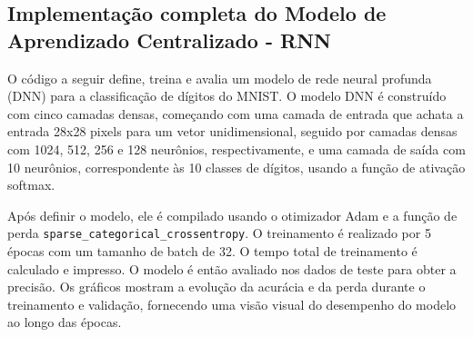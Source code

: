 \subsection{Implementação completa do Modelo de Aprendizado Centralizado - RNN}

O  código a seguir define, treina e avalia um modelo de rede neural profunda (DNN) para a classificação de dígitos do MNIST. O modelo DNN é construído com cinco camadas densas, começando com uma camada de entrada que achata a entrada 28x28 pixels para um vetor unidimensional, seguido por camadas densas com 1024, 512, 256 e 128 neurônios, respectivamente, e uma camada de saída com 10 neurônios, correspondente às 10 classes de dígitos, usando a função de ativação softmax.

Após definir o modelo, ele é compilado usando o otimizador Adam e a função de perda \texttt{sparse\_categorical\_crossentropy}. O treinamento é realizado por 5 épocas com um tamanho de batch de 32. O tempo total de treinamento é calculado e impresso. O modelo é então avaliado nos dados de teste para obter a precisão. Os gráficos mostram a evolução da acurácia e da perda durante o treinamento e validação, fornecendo uma visão visual do desempenho do modelo ao longo das épocas.


